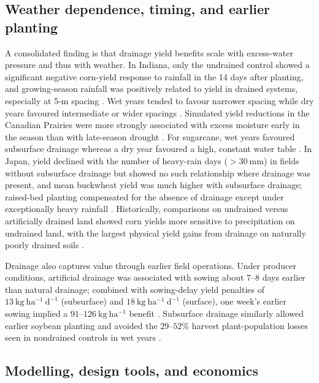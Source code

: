 \documentclass[11pt]{article}
\begin{document}
\subsection{Weather dependence, timing, and earlier planting}

A consolidated finding is that drainage yield benefits scale with excess-water pressure and thus with weather. In Indiana, only the undrained control showed a significant negative corn-yield response to rainfall in the 14 days after planting, and growing-season rainfall was positively related to yield in drained systems, especially at 5-m spacing \parencite{Rui2024}. Wet years tended to favour narrower spacing while dry years favoured intermediate or wider spacings \parencite{Kladivko2005,Acharya2019}. Simulated yield reductions in the Canadian Prairies were more strongly associated with excess moisture early in the season than with late-season drought \parencite{Cordeiro2015}. For sugarcane, wet years favoured subsurface drainage whereas a dry year favoured a high, constant water table \parencite{CAMP1982}. In Japan, yield declined with the number of heavy-rain days (\(>30\ \mathrm{mm}\)) in fields without subsurface drainage but showed no such relationship where drainage was present, and mean buckwheat yield was much higher with subsurface drainage; raised-bed planting compensated for the absence of drainage except under exceptionally heavy rainfall \parencite{Takeshima2023}. Historically, comparisons on undrained versus artificially drained land showed corn yields more sensitive to precipitation on undrained land, with the largest physical yield gains from drainage on naturally poorly drained soils \parencite{JORJANI1991}.

Drainage also captures value through earlier field operations. Under producer conditions, artificial drainage was associated with sowing about 7--8 days earlier than natural drainage; combined with sowing-delay yield penalties of \(13\ \mathrm{kg\ ha^{-1}\ d^{-1}}\) (subsurface) and \(18\ \mathrm{kg\ ha^{-1}\ d^{-1}}\) (surface), one week's earlier sowing implied a \(91\textrm{--}126\ \mathrm{kg\ ha^{-1}}\) benefit \parencite{Mourtzinis2021}. Subsurface drainage similarly allowed earlier soybean planting and avoided the \(29\textrm{--}52\%\) harvest plant-population losses seen in nondrained controls in wet years \parencite{Nelson2011}.

\subsection{Modelling, design tools, and economics}
\end{document}
